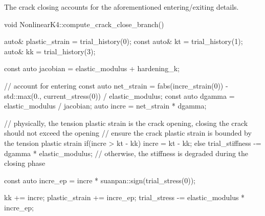 The crack closing accounts for the aforementioned entering/exiting details.
\begin{cppcode}
void NonlinearK4::compute_crack_close_branch() {
    auto& plastic_strain = trial_history(0);
    const auto& kt = trial_history(1);
    auto& kk = trial_history(3);

    const auto jacobian = elastic_modulus + hardening_k;

    // account for entering
    const auto net_strain = fabs(incre_strain(0)) - std::max(0., current_stress(0)) / elastic_modulus;
    const auto dgamma = elastic_modulus / jacobian;
    auto incre = net_strain * dgamma;

    // physically, the tension plastic strain is the crack opening, closing the crack should not exceed the opening
    // ensure the crack plastic strain is bounded by the tension plastic strain
    if(incre > kt - kk) incre = kt - kk;
    else trial_stiffness -= dgamma * elastic_modulus; // otherwise, the stiffness is degraded during the closing phase

    const auto incre_ep = incre * suanpan::sign(trial_stress(0));

    kk += incre;
    plastic_strain += incre_ep;
    trial_stress -= elastic_modulus * incre_ep;
}
\end{cppcode}

